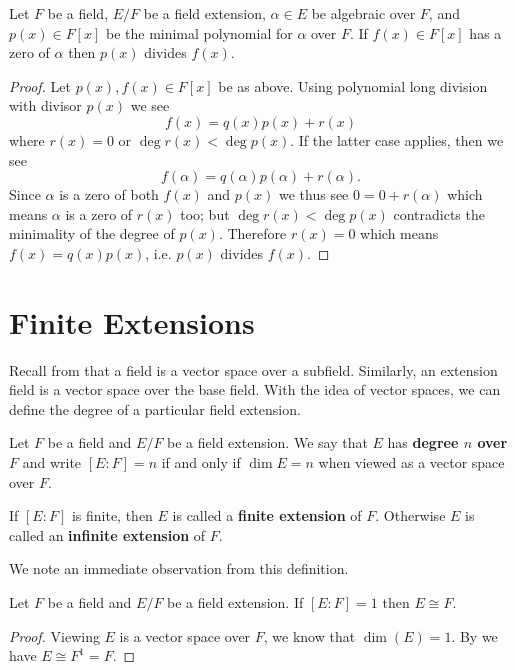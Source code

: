 \begin{corollary}\label{corollary-minimal-polynomial-divides-polynomial-with-same-root}
    Let $F$ be a field, $E/F$ be a field extension, $\alpha \in E$ be algebraic over $F$, and $p(x) \in F[x]$ be the minimal polynomial for $\alpha$ over $F$. If $f(x) \in F[x]$ has a zero of $\alpha$ then $p(x)$ divides $f(x)$.
\end{corollary}
\begin{proof}
    Let $p(x), f(x) \in F[x]$ be as above. Using polynomial long division with divisor $p(x)$ we see
    \[
        f(x) = q(x)p(x) + r(x)
    \]
    where $r(x) = 0$ or $\deg r(x) < \deg p(x)$. If the latter case applies, then we see
    \[
        f(\alpha) = q(\alpha)p(\alpha) + r(\alpha).
    \]
    Since $\alpha$ is a zero of both $f(x)$ and $p(x)$ we thus see $0 = 0 + r(\alpha)$ which means $\alpha$ is a zero of $r(x)$ too; but $\deg r(x) < \deg p(x)$ contradicts the minimality of the degree of $p(x)$. Therefore $r(x) = 0$ which means $f(x) = q(x)p(x)$, i.e. $p(x)$ divides $f(x)$.
\end{proof}

\section{Finite Extensions}
Recall from  that a field is a vector space over a subfield. Similarly, an extension field is a vector space over the base field. With the idea of vector spaces, we can define the degree of a particular field extension.

\begin{definition}
    Let $F$ be a field and $E/F$ be a field extension. We say that $E$ has \textbf{degree $n$ over $F$} and write $[E:F] = n$ if and only if $\dim E = n$ when viewed as a vector space over $F$.

    If $[E:F]$ is finite, then $E$ is called a \textbf{finite extension} of $F$. Otherwise $E$ is called an \textbf{infinite extension} of $F$.
\end{definition}

We note an immediate observation from this definition.
\begin{proposition}
    Let $F$ be a field and $E/F$ be a field extension. If $[E:F] = 1$ then $E \cong F$.
\end{proposition}
\begin{proof}
    Viewing $E$ is a vector space over $F$, we know that $\dim(E) = 1$. By  we have $E\cong F^1 = F$.
\end{proof}

